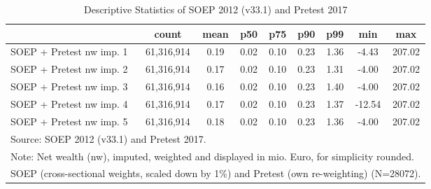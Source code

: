 \begin{table}[htbp]\centering
\def\sym#1{\ifmmode^{#1}\else\(^{#1}\)\fi}
\caption{Descriptive Statistics of SOEP 2012 (v33.1) and Pretest 2017}
\begin{tabular}{l*{1}{cccccccc}}
\hline\hline
                                            &       count&        mean&         p50&         p75&         p90&         p99&         min&         max\\
\hline
SOEP + Pretest nw imp. 1                    &  61,316,914&        0.19&        0.02&        0.10&        0.23&        1.36&       -4.43&      207.02\\
SOEP + Pretest nw imp. 2                    &  61,316,914&        0.17&        0.02&        0.10&        0.23&        1.31&       -4.00&      207.02\\
SOEP + Pretest nw imp. 3                    &  61,316,914&        0.16&        0.02&        0.10&        0.23&        1.40&       -4.00&      207.02\\
SOEP + Pretest nw imp. 4                    &  61,316,914&        0.17&        0.02&        0.10&        0.23&        1.37&      -12.54&      207.02\\
SOEP + Pretest nw imp. 5                    &  61,316,914&        0.18&        0.02&        0.10&        0.23&        1.36&       -4.00&      207.02\\
\hline\hline
\multicolumn{9}{l}{\footnotesize Source: SOEP 2012 (v33.1) and Pretest 2017.}\\
\multicolumn{9}{l}{\footnotesize Note: Net wealth (nw), imputed, weighted and displayed in mio. Euro, for simplicity rounded.}\\
\multicolumn{9}{l}{\footnotesize SOEP (cross-sectional weights, scaled down by 1\%) and Pretest (own re-weighting) (N=28072).}\\
\end{tabular}
\end{table}
